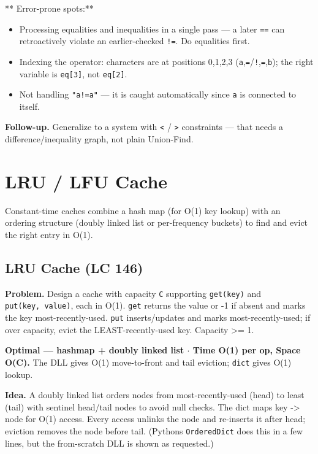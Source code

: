 \documentclass[11pt]{article}
\providecommand{\tightlist}{\setlength{\itemsep}{1pt}\setlength{\parskip}{0pt}}
\begin{document}
** Error-prone spots:**

\begin{itemize}
\tightlist
\item
  Processing equalities and inequalities in a single pass --- a later \texttt{==} can retroactively violate an earlier-checked \texttt{!=}. Do equalities first.
\item
  Indexing the operator: characters are at positions 0,1,2,3 (\texttt{a},\texttt{=}/\texttt{!},\texttt{=},\texttt{b}); the right variable is \texttt{eq{[}3{]}}, not \texttt{eq{[}2{]}}.
\item
  Not handling \texttt{"a!=a"} --- it is caught automatically since \texttt{a} is connected to itself.
\end{itemize}

\textbf{Follow-up.} Generalize to a system with \texttt{\textless{}} / \texttt{\textgreater{}} constraints --- that needs a difference/inequality graph, not plain Union-Find.

\section{LRU / LFU Cache}\label{lru--lfu-cache}

Constant-time caches combine a hash map (for O(1) key lookup) with an ordering structure (doubly linked list or per-frequency buckets) to find and evict the right entry in O(1).

\subsection{LRU Cache (LC 146)}\label{lru-cache-lc-146}

\textbf{Problem.} Design a cache with capacity \texttt{C} supporting \texttt{get(key)} and \texttt{put(key,\ value)}, each in O(1). \texttt{get} returns the value or -1 if absent and marks the key most-recently-used. \texttt{put} inserts/updates and marks most-recently-used; if over capacity, evict the LEAST-recently-used key. Capacity \textgreater= 1.

\textbf{Optimal --- hashmap + doubly linked list \(\cdot\) Time O(1) per op, Space O(C).} The DLL gives O(1) move-to-front and tail eviction; \texttt{dict} gives O(1) lookup.

\textbf{Idea.} A doubly linked list orders nodes from most-recently-used (head) to least (tail) with sentinel head/tail nodes to avoid null checks. The dict maps key -\textgreater{} node for O(1) access. Every access unlinks the node and re-inserts it after head; eviction removes the node before tail. (Python\textquotesingle s \texttt{OrderedDict} does this in a few lines, but the from-scratch DLL is shown as requested.)
\end{document}
